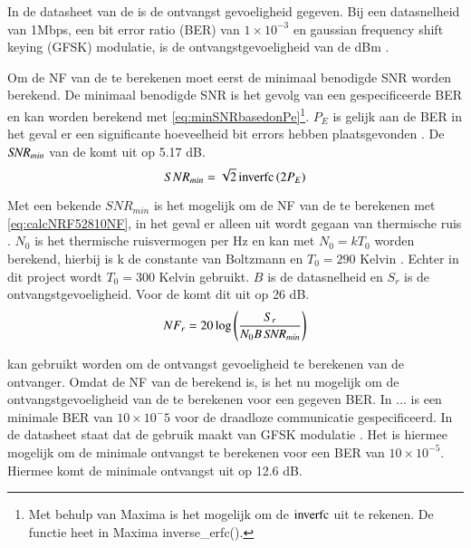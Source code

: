 In de datasheet van de \mcu is de ontvangst gevoeligheid gegeven. Bij een datasnelheid van 1Mbps, een bit error ratio (BER) van  $1 \times 10^{-3}$ en gaussian frequency shift keying (GFSK) modulatie, is de ontvangstgevoeligheid van de  dBm \cite{dsNrf52810}.

Om de NF van de \mcu te berekenen moet eerst de minimaal benodigde SNR worden berekend. De minimaal benodigde SNR is het gevolg van een gespecificeerde BER en kan worden berekend met \cref{eq:minSNRbasedonPe}\footnote{Met behulp van Maxima is het mogelijk om de $\operatorname{inverfc}$  uit te rekenen. De functie heet in Maxima inverse\_erfc().}. $P_E$ is gelijk aan de BER in het geval er een significante hoeveelheid bit errors hebben plaatsgevonden \cite{BERtoPe}. De $\mbox{\textit{SNR}}_{min}$ van de \mcu komt uit op 5.17 dB. 
\begin{equation}\label{eq:minSNRbasedonPe}
    SNR_{min}=\sqrt{2}\inverfc\left(2P_E\right)
    \tagaddtext{[\si{\decibel}]}
\end{equation}

Met een bekende $SNR_{min}$ is het mogelijk om de NF van de \mcu te berekenen met \cref{eq:calcNRF52810NF}, in het geval er alleen uit wordt gegaan van thermische ruis \cite{SWRA030}. $N_0$ is het thermische ruisvermogen per Hz en kan met $N_0=kT_0$ worden berekend, hierbij is k de constante van Boltzmann en $T_0=290$ Kelvin \cite{Short-rangeWirelessCommunication}. Echter in dit project wordt $T_0=300$ Kelvin gebruikt. $B$ is de datasnelheid en $S_r$ is de ontvangstgevoeligheid. Voor de \mcu komt dit uit op 26 dB.
\begin{equation}\label{eq:calcNRF52810NF}
    NF_r=20\log\left(\frac{S_{r}}{N_0B\,\SNR_{min}}\right)
    \tagaddtext{[\si{\decibel}]}
\end{equation}

 kan gebruikt worden om de ontvangst gevoeligheid te berekenen van de ontvanger. Omdat de NF van de \mcu berekend is, is het nu mogelijk om de ontvangstgevoeligheid van de \mcu te berekenen voor een gegeven BER. In ... is een minimale BER van $10\times10^-5$ voor de draadloze communicatie gespecificeerd. In de datasheet staat dat de \mcu gebruik maakt van GFSK modulatie \cite{dsNrf52810}. Het is hiermee mogelijk om de minimale ontvangst \SNR te berekenen voor een BER van $10\times10^{-5}$. Hiermee komt de minimale ontvangst \SNR uit op 12.6 dB.


